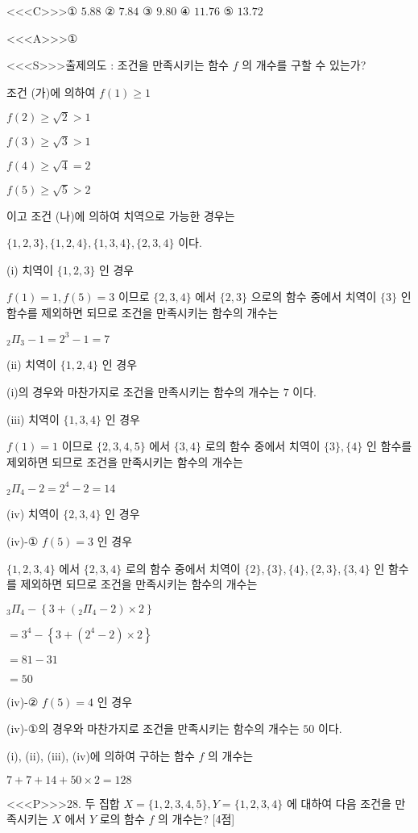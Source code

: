\documentclass{oblivoir}
\begin{document}
<<<C>>>① $5.88$
② $7.84$
③ $9.80$
④ $11.76$
⑤ $13.72$


<<<A>>>①

<<<S>>>출제의도 : 조건을 만족시키는 함수 $f$ 의 개수를 구할 수 있는가?

조건 (가)에 의하여
$f(1) \geq 1$

$f(2) \geq \sqrt{2}>1$

$f(3) \geq \sqrt{3}>1$

$f(4) \geq \sqrt{4}=2$

$f(5) \geq \sqrt{5}>2$

이고 조건 (나)에 의하여 치역으로 가능한 경우는

$\{1,2,3\},\{1,2,4\},\{1,3,4\},\{2,3,4\}$
이다.

(i) 치역이 $\{1,2,3\}$ 인 경우

$f(1)=1, f(5)=3$ 이므로 $\{2,3,4\}$ 에서 $\{2,3\}$ 으로의 함수 중에서 치역이 $\{3\}$ 인 함수를 제외하면 되므로 조건을 만족시키는 함수의 개수는

${ }_{2} \Pi_{3}-1=2^{3}-1=7$

(ii) 치역이 $\{1,2,4\}$ 인 경우

(i)의 경우와 마찬가지로 조건을 만족시키는 함수의 개수는 $7$ 이다.

(iii) 치역이 $\{1,3,4\}$ 인 경우

$f(1)=1$ 이므로 $\{2,3,4,5\}$ 에서 $\{3,4\}$ 로의 함수 중에서 치역이 $\{3\},\{4\}$ 인 함수를
제외하면 되므로 조건을 만족시키는 함수의 개수는

${ }_{2} \Pi_{4}-2=2^{4}-2=14$

(iv) 치역이 $\{2,3,4\}$ 인 경우

(iv)-① $f(5)=3$ 인 경우

$\{1,2,3,4\}$ 에서 $\{2,3,4\}$ 로의 함수 중에서 치역이 $\{2\},\{3\},\{4\},\{2,3\},\{3,4\}$ 인 함수를 제외하면 되므로 조건을 만족시키는 함수의 개수는

${ }_{3} \Pi_{4}-\left\{3+\left({ }_{2} \Pi_{4}-2\right) \times 2\right\}$

$=3^{4}-\left\{3+\left(2^{4}-2\right) \times 2\right\}$

$=81-31$

$=50$

(iv)-② $f(5)=4$ 인 경우

(iv)-①의 경우와 마찬가지로 조건을 만족시키는 함수의 개수는 $50$ 이다.

(i), (ii), (iii), (iv)에 의하여 구하는 함수 $f$ 의 개수는

$7+7+14+50 \times 2=128$


<<<P>>>28. 두 집합 $X=\{1,2,3,4,5\}, Y=\{1,2,3,4\}$ 에 대하여 다음 조건을 만족시키는 $X$ 에서 $Y$ 로의 함수 $f$ 의 개수는? [4점]
\end{document}
